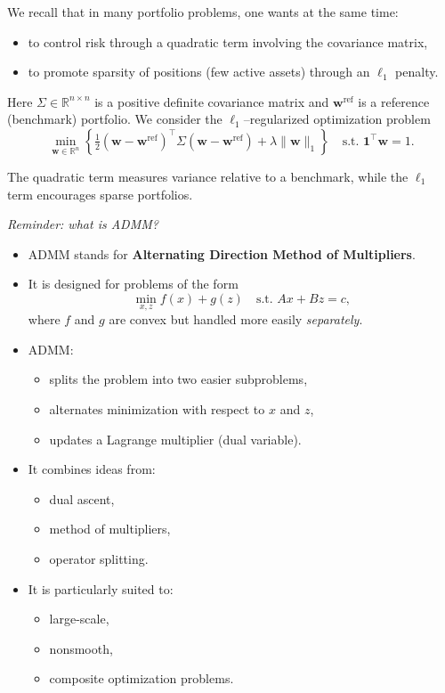 \documentclass[11pt]{article}
\begin{document}
\begin{enumerate}
We recall that in many portfolio problems, one wants at the same time:
\begin{itemize}
\item to control risk through a quadratic term involving the covariance matrix,
\item to promote sparsity of positions (few active assets) through an $\ell_1$ penalty.
\end{itemize}

Here $\Sigma \in \mathbb{R}^{n\times n}$ is a positive definite covariance matrix and 
$\bm{w}^{\mathrm{ref}}$ is a reference (benchmark) portfolio. We consider the $\ell_1$–regularized
optimization problem
\[
\min_{\bm{w}\in\mathbb{R}^n}
\left\{
\tfrac{1}{2}(\bm{w}-\bm{w}^{\mathrm{ref}})^\top \Sigma (\bm{w}-\bm{w}^{\mathrm{ref}})
+ \lambda \|\bm{w}\|_1
\right\}
\quad \text{s.t. } \bm{1}^\top \bm{w} = 1.
\]

The quadratic term measures variance relative to a benchmark, while the $\ell_1$ term encourages sparse portfolios.

\medskip
\noindent\emph{Reminder: what is ADMM?}

\begin{itemize}
\item ADMM stands for \textbf{Alternating Direction Method of Multipliers}.
\item It is designed for problems of the form
\[
\min_{x,z} f(x)+g(z)\quad \text{s.t. } Ax+Bz=c,
\]
where $f$ and $g$ are convex but handled more easily \emph{separately}.
\item ADMM:
\begin{itemize}
\item splits the problem into two easier subproblems,
\item alternates minimization with respect to $x$ and $z$,
\item updates a Lagrange multiplier (dual variable).
\end{itemize}
\item It combines ideas from:
\begin{itemize}
\item dual ascent,
\item method of multipliers,
\item operator splitting.
\end{itemize}
\item It is particularly suited to:
\begin{itemize}
\item large-scale,
\item nonsmooth,
\item composite optimization problems.
\end{itemize}
\end{itemize}


\end{enumerate}
\end{document}
